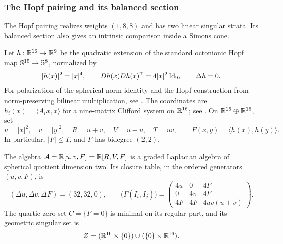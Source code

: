 \subsubsection{The Hopf pairing and its balanced section}
\label{sec:Hopf-pairing}

The Hopf pairing realizes weights $(1,8,8)$ and has two linear
singular strata. Its balanced section also gives an intrinsic
comparison inside a Simons cone.

Let \(h:\mathbb R^{16}\to\mathbb R^9\) be the quadratic extension of the standard
octonionic Hopf map \(\mathbb S^{15}\to\mathbb S^8\), normalized by
\begin{equation}\label{eq:Hopf-normalization}
 |h(x)|^2=|x|^4,\qquad
 Dh(x)Dh(x)^{\mathsf T}=4|x|^2\operatorname{Id}_9,\qquad \Delta h=0.
\end{equation}
For polarization of the spherical norm identity and the Hopf construction
from norm-preserving bilinear multiplication, see
\cite[Chapter~15]{Shapiro2000}.
The coordinates are \(h_i(x)=\langle A_ix,x\rangle\) for a nine-matrix Clifford
system on \(\mathbb R^{16}\); see \cite[Theorem~A and Section~1.2]{Radeschi14}.
On \(\mathbb R^{16}\oplus\mathbb R^{16}\), set
\begin{equation}\label{eq:Hopf-pairing-definitions}
 u=|x|^2,\quad v=|y|^2,\quad R=u+v,\quad V=u-v,\quad T=uv,
 \qquad F(x,y)=\langle h(x),h(y)\rangle.
\end{equation}
In particular, \(|F|\leq T\), and \(F\) has bidegree \((2,2)\).

\begin{proposition}\label{prop:Hopf-closure}
The algebra \(\mathcal A=\mathbb R[u,v,F]=\mathbb R[R,V,F]\) is a graded Laplacian
algebra of spherical quotient dimension two. Its closure table, in
the ordered generators \((u,v,F)\), is
\begin{equation}\label{eq:Hopf-closure}
 (\Delta u,\Delta v,\Delta F)=(32,32,0),\qquad
 \bigl(\Gamma(I_i,I_j)\bigr)=
 \begin{pmatrix}
  4u&0&4F\\
  0&4v&4F\\
  4F&4F&4uv(u+v)
 \end{pmatrix}.
\end{equation}
The quartic zero set \(C=\{F=0\}\) is minimal on its regular part,
and its geometric singular set is
\begin{equation}\label{eq:Hopf-singular-set}
 Z=(\mathbb R^{16}\times\{0\})\cup(\{0\}\times\mathbb R^{16}).
\end{equation}
\end{proposition}

